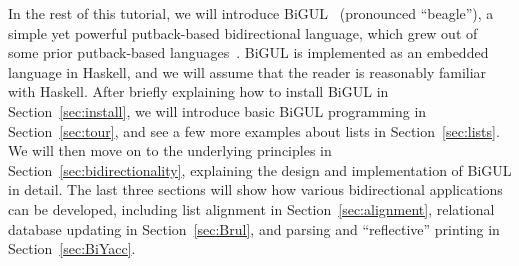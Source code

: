 In the rest of this tutorial, we will introduce BiGUL~\cite{KoZH16} (pronounced ``beagle''),
a simple yet powerful putback-based bidirectional language,
which grew out of some prior putback-based languages~\cite{PaHF14,PaZH14}.
BiGUL is implemented as an embedded language in Haskell, and we will assume that the reader is reasonably familiar with Haskell.
After briefly explaining how to install BiGUL in Section~\ref{sec:install}, we will introduce basic BiGUL programming in Section~\ref{sec:tour}, and see a few more examples about lists in Section~\ref{sec:lists}.
We will then move on to the underlying principles in Section~\ref{sec:bidirectionality}, explaining the design and implementation of BiGUL in detail.
The last three sections will show how various bidirectional applications can be developed, including list alignment in Section~\ref{sec:alignment}, relational database updating in Section~\ref{sec:Brul}, and parsing and ``reflective'' printing in Section~\ref{sec:BiYacc}.





